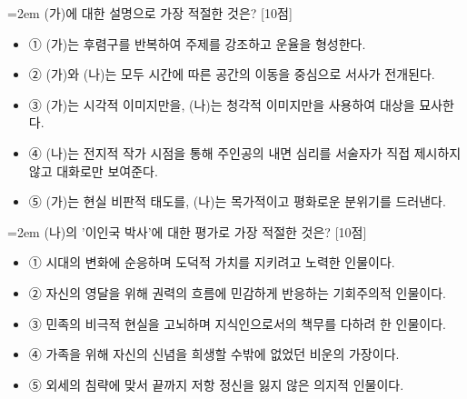 \documentclass[11pt,a4paper]{article}
\newcommand{\qnum}[1]{%
  \tikz[baseline=(num.base)]{%
    \node[circle, fill=numCircle, text=white, inner sep=0pt,
          minimum size=18pt, font=\small\bfseries] (num) {#1};%
  }%
}
\newcommand{\pts}[1]{%
  \hfill\textcolor{ptsBadge}{[#1점]}%
}
\begin{document}
\begin{minipage}{\columnwidth}
{\hangindent=2em
\qnum{17}\enspace (가)에 대한 설명으로 가장 적절한 것은? \pts{10}
\par}

\vspace{3mm}
\begin{itemize}[leftmargin=2.5em, labelsep=0.3em, label={}, itemsep=4pt, parsep=1pt, topsep=0pt]
  \item ① (가)는 후렴구를 반복하여 주제를 강조하고 운율을 형성한다.
  \item ② (가)와 (나)는 모두 시간에 따른 공간의 이동을 중심으로 서사가 전개된다.
  \item ③ (가)는 시각적 이미지만을, (나)는 청각적 이미지만을 사용하여 대상을 묘사한다.
  \item ④ (나)는 전지적 작가 시점을 통해 주인공의 내면 심리를 서술자가 직접 제시하지 않고 대화로만 보여준다.
  \item ⑤ (가)는 현실 비판적 태도를, (나)는 목가적이고 평화로운 분위기를 드러낸다.
\end{itemize}
\end{minipage}
\vspace{4mm}

\vspace{4mm}
\begin{minipage}{\columnwidth}
{\hangindent=2em
\qnum{18}\enspace (나)의 '이인국 박사'에 대한 평가로 가장 적절한 것은? \pts{10}
\par}

\vspace{3mm}
\begin{itemize}[leftmargin=2.5em, labelsep=0.3em, label={}, itemsep=4pt, parsep=1pt, topsep=0pt]
  \item ① 시대의 변화에 순응하며 도덕적 가치를 지키려고 노력한 인물이다.
  \item ② 자신의 영달을 위해 권력의 흐름에 민감하게 반응하는 기회주의적 인물이다.
  \item ③ 민족의 비극적 현실을 고뇌하며 지식인으로서의 책무를 다하려 한 인물이다.
  \item ④ 가족을 위해 자신의 신념을 희생할 수밖에 없었던 비운의 가장이다.
  \item ⑤ 외세의 침략에 맞서 끝까지 저항 정신을 잃지 않은 의지적 인물이다.
\end{itemize}
\end{minipage}
\vspace{4mm}
\end{document}
